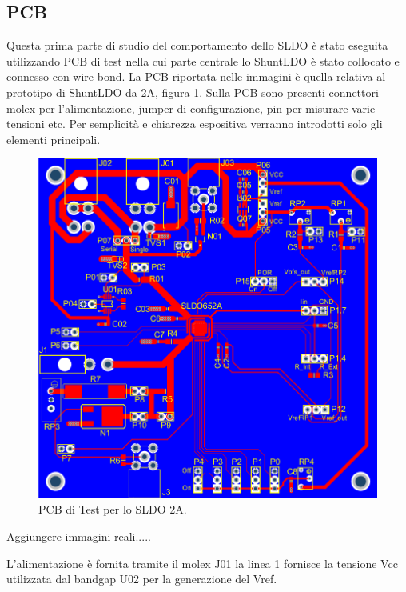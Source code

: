 \subsection{PCB}
Questa prima parte di studio del comportamento dello SLDO è stato eseguita utilizzando PCB di test nella cui parte centrale lo ShuntLDO è stato collocato e connesso con wire-bond. La PCB riportata nelle immagini è quella relativa al prototipo di ShuntLDO da 2A, figura \ref{PCBTestSLDO}. 
Sulla PCB sono presenti connettori molex per l'alimentazione, jumper di configurazione, pin per misurare varie tensioni etc. Per semplicità e chiarezza espositiva verranno introdotti solo gli elementi principali.

\begin{figure}
\centering
\includegraphics[scale=.3]{Immagini/chipcard}
\caption{PCB di Test per lo SLDO 2A.}
\label{PCBTestSLDO}
\end{figure}

Aggiungere immagini reali.....

L'alimentazione è fornita tramite il molex J01 la linea 1 fornisce la tensione Vcc utilizzata dal bandgap U02 per la generazione del Vref.

